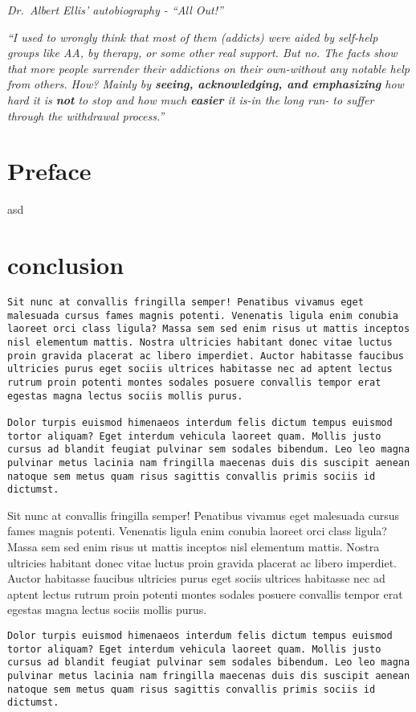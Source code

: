 \documentclass[
]{book}
\begin{document}
\emph{Dr.~Albert Ellis' autobiography - ``All Out!''}

\emph{``I used to wrongly think that most of them (addicts) were aided by self-help groups like AA, by therapy, or some other real support. But no. The facts show that more people surrender their addictions on their own-without any notable help from others. How? Mainly by \textbf{seeing, acknowledging, and emphasizing} how hard it is \textbf{not} to stop and how much \textbf{easier} it is-in the long run- to suffer through the withdrawal process.''}

\hypertarget{preface}{%
\chapter{Preface}\label{preface}}

asd

\hypertarget{conclusion}{%
\chapter{conclusion}\label{conclusion}}

\begin{verbatim}
Sit nunc at convallis fringilla semper! Penatibus vivamus eget malesuada cursus fames magnis potenti. Venenatis ligula enim conubia laoreet orci class ligula? Massa sem sed enim risus ut mattis inceptos nisl elementum mattis. Nostra ultricies habitant donec vitae luctus proin gravida placerat ac libero imperdiet. Auctor habitasse faucibus ultricies purus eget sociis ultrices habitasse nec ad aptent lectus rutrum proin potenti montes sodales posuere convallis tempor erat egestas magna lectus sociis mollis purus.

Dolor turpis euismod himenaeos interdum felis dictum tempus euismod tortor aliquam? Eget interdum vehicula laoreet quam. Mollis justo cursus ad blandit feugiat pulvinar sem sodales bibendum. Leo leo magna pulvinar metus lacinia nam fringilla maecenas duis dis suscipit aenean natoque sem metus quam risus sagittis convallis primis sociis id dictumst.
\end{verbatim}

Sit nunc at convallis fringilla semper! Penatibus vivamus eget malesuada cursus fames magnis potenti. Venenatis ligula enim conubia laoreet orci class ligula? Massa sem sed enim risus ut mattis inceptos nisl elementum mattis. Nostra ultricies habitant donec vitae luctus proin gravida placerat ac libero imperdiet. Auctor habitasse faucibus ultricies purus eget sociis ultrices habitasse nec ad aptent lectus rutrum proin potenti montes sodales posuere convallis tempor erat egestas magna lectus sociis mollis purus.

\begin{verbatim}
Dolor turpis euismod himenaeos interdum felis dictum tempus euismod tortor aliquam? Eget interdum vehicula laoreet quam. Mollis justo cursus ad blandit feugiat pulvinar sem sodales bibendum. Leo leo magna pulvinar metus lacinia nam fringilla maecenas duis dis suscipit aenean natoque sem metus quam risus sagittis convallis primis sociis id dictumst.
\end{verbatim}

  
\end{document}
